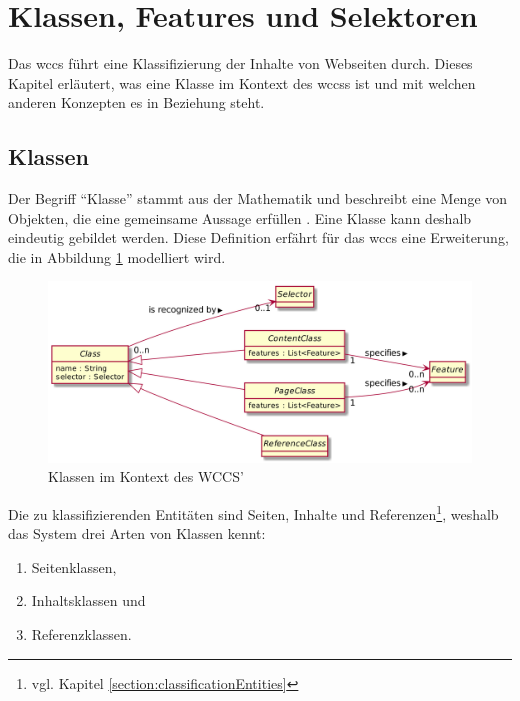 \section{Klassen, Features und Selektoren}
    \label{section:conceptClassesFeaturesSelectors}
    Das \gls{wccs} führt eine Klassifizierung der Inhalte von Webseiten durch.
    Dieses Kapitel erläutert, was eine Klasse im Kontext des \glspl{wccs} ist
    und mit welchen anderen Konzepten es in Beziehung steht.

    \subsection{Klassen}
        Der Begriff "`Klasse"' stammt aus der Mathematik und beschreibt eine Menge von Objekten,
        die eine gemeinsame Aussage erfüllen \cite{oberschelp:Mengenlehre}.
        Eine Klasse kann deshalb eindeutig gebildet werden.
        Diese Definition erfährt für das \gls{wccs} eine Erweiterung,
        die in Abbildung \ref{image:conceptClasses} modelliert wird.

        \begin{figure}[htb]
            \centering
            \includegraphics[scale=\imageScalingFactor]{../resources/concept/classes.png}
            \caption{Klassen im Kontext des WCCS'}
            \label{image:conceptClasses}
        \end{figure}

        Die zu klassifizierenden Entitäten sind Seiten, Inhalte und
        Referenzen\footnote{vgl. Kapitel \ref{section:classificationEntities}},
        weshalb das System drei Arten von Klassen kennt:

        \begin{enumerate}
            \item Seitenklassen,
            \item Inhaltsklassen und
            \item Referenzklassen.
        \end{enumerate}

